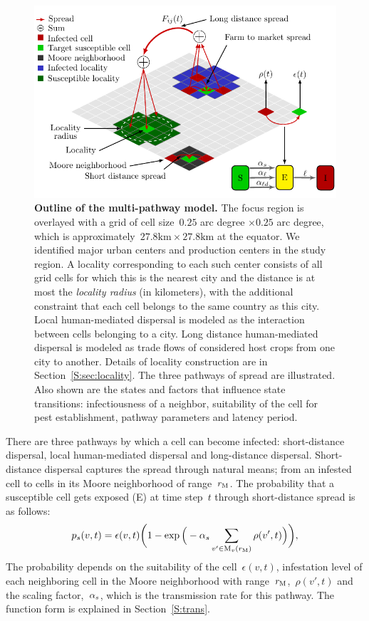 \documentclass[11pt]{article}
\newcommand{\infest}{\rho}
\newcommand{\suitable}{\epsilon}
\theoremstyle{definition}
\begin{document}
\begin{figure}[t]
    \centering
    \includegraphics[width=.8\textwidth]{figs/model_schematic.pdf}
\caption{\textbf{Outline of the multi-pathway model.}
The focus region is overlayed with a grid of cell size~$0.25$ arc degree
$\times 0.25$ arc degree, which is
approximately~$27.8\mathrm{km}\times\mathrm{27.8km}$ at the equator. 
We identified major urban centers and production centers in the study
region. A locality corresponding to each such center consists of all grid
cells for which this is the nearest city and the distance is at most the
\emph{locality radius} (in kilometers), with the additional constraint that
each cell belongs to the same country as this city. Local human-mediated
dispersal is modeled as the interaction between cells belonging to a city.
Long distance human-mediated dispersal is modeled as trade flows of
considered host crops from one city to another.  Details of locality
construction are in Section~\ref{S:sec:locality}. The three pathways of
spread are illustrated. Also shown are the states and factors that
influence state transitions: infectiousness of a neighbor, suitability of
the cell for pest establishment, pathway parameters and latency period.
\label{fig:modelConcept}}
\end{figure}
There are three pathways by which a cell can become infected:
short-distance dispersal, local human-mediated dispersal and long-distance
dispersal. Short-distance dispersal captures the spread through natural
means; from an infested cell to cells in its Moore neighborhood of
range~$r_\mathrm{M}$. 
The probability that a susceptible cell gets exposed (E) at time step~$t$
through short-distance spread is as follows:
\begin{align}\label{eqn:pshort}
    \pshort(v,t)=\suitable(v,t)\bigg(1-
    \exp\Big(-\asd\sum_{v'\in\moore_v(\mooreRange)}\infest(v',t)\Big)\bigg),
\end{align}
The probability depends on the suitability of the cell~$\suitable(v,t)$,
infestation level of each neighboring cell in the Moore neighborhood with 
range~$r_\mathrm{M}$,~$\infest(v',t)$ and the scaling factor,~$\alpha_s$, which is the transmission rate for this pathway. The
function form is explained in Section~\ref{S:trans}.
\end{document}
